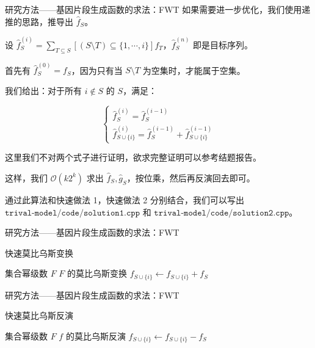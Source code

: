 \documentclass[10pt,aspectratio=43,mathserif]{ctexbeamer}
\begin{document}
	\begin{frame}{研究方法——基因片段生成函数的求法：FWT}
		如果需要进一步优化，我们使用递推的思路，推导出 $\hat f_S$。
		
		设 $\hat f_S^{(i)}=\sum_{T\subseteq S}[(S\setminus T)\subseteq\{1,\cdots,i\}]f_T$，$\hat f_S^{(n)}$ 即是目标序列。
		
		首先有 $\hat f_S^{(0)}=f_S$，因为只有当 $S \setminus T$ 为空集时，才能属于空集。
		
		我们给出：对于所有 $i\notin S$ 的 $S$，满足：
		
		$$
		\begin{cases}
			\hat f_S^{(i)}=\hat f_S^{(i-1)} \\
			\hat f_{S\cup\{i\}}^{(i)}=\hat f_S^{(i-1)}+\hat f_{S\cup\{i\}}^{(i-1)}
		\end{cases}
		$$
		
		这里我们不对两个式子进行证明，欲求完整证明可以参考结题报告。
		
		这样，我们 $\mathcal{O}(k2^k)$ 求出 $\hat f_S,\hat g_S$，按位乘，然后再反演回去即可。
		
		通过此算法和快速做法 1，快速做法 2 分别结合，我们可以写出 $\texttt{trival-model/code/solution1.cpp}$ 和 $\texttt{trival-model/code/solution2.cpp}$。
	\end{frame}

	\begin{frame}{研究方法——基因片段生成函数的求法：FWT}
		\begin{algorithm}[H]
			\caption{快速莫比乌斯变换}
			\begin{algorithmic}[1]
				\Require 集合幂级数 $F$
				\Ensure $F$ 的莫比乌斯变换
				\State $f_{S \cup \{i\}} \gets f_{S \cup \{i\}} + f_{S}$
				\EndFor
				\EndFor
				\State {}
				\EndFunction
			\end{algorithmic}
		\end{algorithm}
	\end{frame}

	\begin{frame}{研究方法——基因片段生成函数的求法：FWT}
		\begin{algorithm}[H]
			\caption{快速莫比乌斯反演}
			\begin{algorithmic}[1]
				\Require 集合幂级数 $F$
				\Ensure $f$ 的莫比乌斯反演
				\State $f_{S \cup \{i\}} \gets f_{S \cup \{i\}} - f_{S}$
				\EndFor
				\EndFor
				\State {}
				\EndFunction
			\end{algorithmic}
		\end{algorithm}
	\end{frame}
\end{document}

